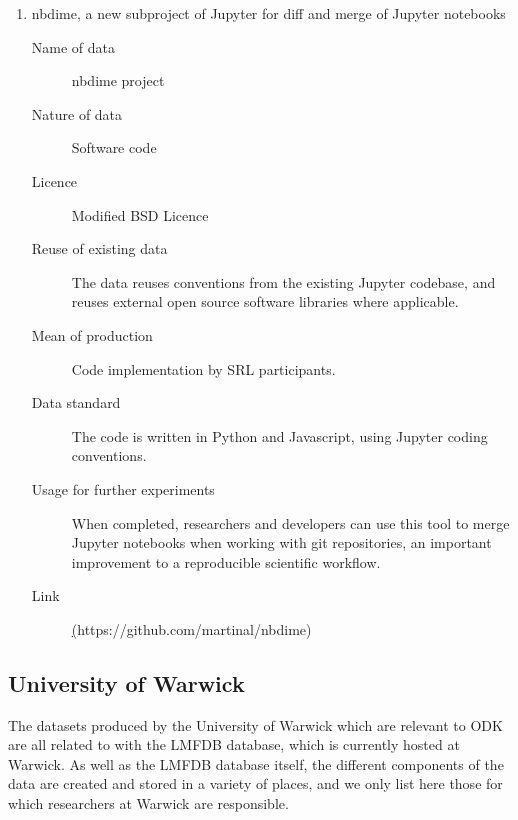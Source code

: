 \documentclass[12pt]{article}
\begin{document}
\begin{enumerate}

  \item nbdime, a new subproject of Jupyter for diff and merge of Jupyter notebooks
    \begin{description}
    \item[Name of data] nbdime project
    \item[Nature of data] Software code
    \item[Licence] Modified BSD Licence
    \item[Reuse of existing data] The data reuses conventions from the
      existing Jupyter codebase, and reuses external open source
      software libraries where applicable.
    \item[Mean of production] Code implementation by SRL participants.
    \item[Data standard] The code is written in Python and Javascript, using Jupyter coding conventions.
    \item [Usage for further experiments] When completed, researchers
      and developers can use this tool to merge Jupyter notebooks
      when working with git repositories, an important improvement to
      a reproducible scientific workflow.
    \item [Link] \href{https://github.com/martinal/nbdime}(https://github.com/martinal/nbdime)
    \end{description}

\end{enumerate}

\subsection{University of Warwick}

The datasets produced by the University of Warwick which are relevant
to ODK are all related to with the LMFDB database, which is currently
hosted at Warwick.  As well as the LMFDB database itself, the
different components of the data are created and stored in a variety
of places, and we only list here those for which researchers at
Warwick are responsible.
\end{document}
